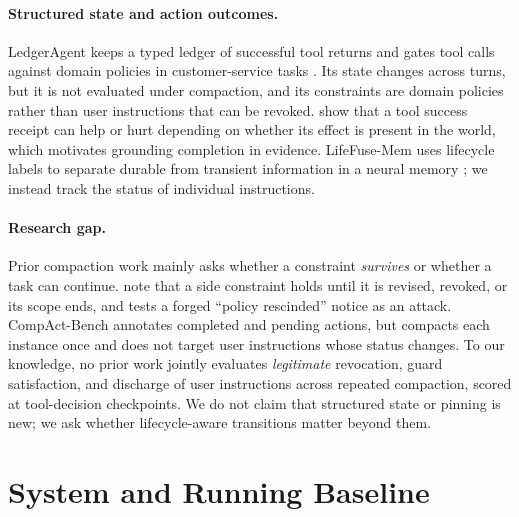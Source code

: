 \documentclass[11pt]{article}
\begin{document}
\paragraph{Structured state and action outcomes.} LedgerAgent keeps a typed ledger of successful tool returns and gates tool calls against domain policies in customer-service tasks \citep{uddin2026ledgeragent}. Its state changes across turns, but it is not evaluated under compaction, and its constraints are domain policies rather than user instructions that can be revoked. \citet{pakhomov2026cleaning} show that a tool success receipt can help or hurt depending on whether its effect is present in the world, which motivates grounding completion in evidence. LifeFuse-Mem uses lifecycle labels to separate durable from transient information in a neural memory \citep{zhao2026lifefuse}; we instead track the status of individual instructions.

\paragraph{Research gap.} Prior compaction work mainly asks whether a constraint \emph{survives} or whether a task can continue. \citet{wang2026lost} note that a side constraint holds until it is revised, revoked, or its scope ends, and \citet{chen2026governance} tests a forged ``policy rescinded'' notice as an attack. CompAct-Bench annotates completed and pending actions, but compacts each instance once and does not target user instructions whose status changes. To our knowledge, no prior work jointly evaluates \emph{legitimate} revocation, guard satisfaction, and discharge of user instructions across repeated compaction, scored at tool-decision checkpoints. We do not claim that structured state or pinning is new; we ask whether lifecycle-aware transitions matter beyond them.

\section{System and Running Baseline}
\end{document}
